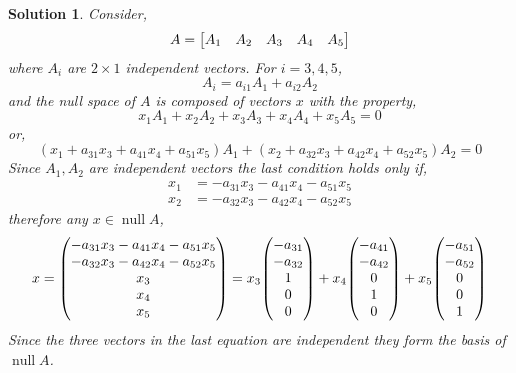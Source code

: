 \documentclass[11pt,a4paper]{scrartcl}
\DeclareMathOperator{\nspace}{null}
\theoremstyle{solve}
\newtheorem*{solution}{Solution}
\begin{document}
\begin{solution}
    Consider,
    \[
    A = \mqty[ A_1 & A_2 & A_3 & A_4 & A_5 ]
    \]
    where $A_i$ are $2 \times 1$ independent vectors. For $i=3,4,5$,
    \[
    A_i = a_{i1} A_1 + a_{i2} A_2 
    \]
    and the null space of $A$ is composed of vectors $x$ with the property,
    \[
    x_1A_1+x_2A_2+x_3A_3+x_4A_4+x_5A_5=0
    \]
    or,
    \[
    (x_1+a_{31}x_3+a_{41}x_4+a_{51}x_5)A_1
    +
    (x_2+a_{32}x_3+a_{42}x_4+a_{52}x_5)A_2
    =0
    \]
    Since $A_1,A_2$ are independent vectors the last condition holds 
    only if,
    \begin{align*}
    x_1 & = -a_{31}x_3-a_{41}x_4-a_{51}x_5 \\
    x_2 & = -a_{32}x_3-a_{42}x_4-a_{52}x_5    
    \end{align*}
    therefore any $x \in \nspace A$,
    \[
    x = \mqty(
    -a_{31}x_3-a_{41}x_4-a_{51}x_5 \\
    -a_{32}x_3-a_{42}x_4-a_{52}x_5  \\
    x_3 \\
    x_4 \\
    x_5
    )   
    = x_3 \mqty(
    -a_{31} \\
    -a_{32} \\
    1 \\
    0 \\
    0
    )
    +
    x_4 \mqty(
    -a_{41} \\
    -a_{42} \\
    0 \\
    1 \\
    0
    )
    +
    x_5 \mqty(
    -a_{51} \\
    -a_{52} \\
    0 \\
    0 \\
    1
    )
    \]
    Since the three vectors in the last equation are independent
    they form the basis of $\nspace A$.


\end{solution}
\end{document}
